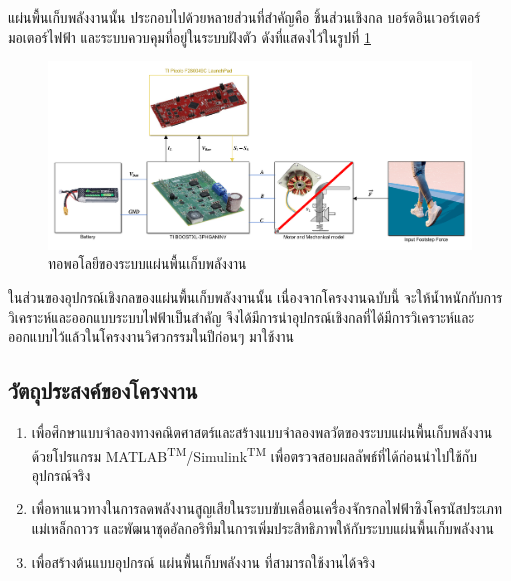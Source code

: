 \documentclass[11pt,a4paper]{article}
\begin{document}
แผ่นพื้นเก็บพลังงานนั้น ประกอบไปด้วยหลายส่วนที่สำคัญคือ ชิ้นส่วนเชิงกล บอร์ดอินเวอร์เตอร์ มอเตอร์ไฟฟ้า และระบบควบคุมที่อยู่ในระบบฝังตัว ดังที่แสดงไว้ในรูปที่ \ref{genpathtopology}

\begin{figure}[!h]
    \centering
    \includegraphics[width=\textwidth]{genpath_topology.png}
    \caption{ทอพอโลยีของระบบแผ่นพื้นเก็บพลังงาน}
    \label{genpathtopology}
\end{figure}

ในส่วนของอุปกรณ์เชิงกลของแผ่นพื้นเก็บพลังงานนั้น เนื่องจากโครงงานฉบับนี้ จะให้น้ำหนักกับการวิเคราะห์และออกแบบระบบไฟฟ้าเป็นสำคัญ จึงได้มีการนำอุปกรณ์เชิงกลที่ได้มีการวิเคราะห์และออกแบบไว้แล้วในโครงงานวิศวกรรมในปีก่อนๆ \cite{GpH:01} มาใช้งาน

\subsection{วัตถุประสงค์ของโครงงาน}
\begin{enumerate}
    \item เพื่อศึกษาแบบจำลองทางคณิตศาสตร์และสร้างแบบจำลองพลวัตของระบบแผ่นพื้นเก็บพลังงานด้วยโปรแกรม MATLAB\textsuperscript{TM}/Simulink\textsuperscript{TM} เพื่อตรวจสอบผลลัพธ์ที่ได้ก่อนนำไปใช้กับอุปกรณ์จริง
    \item เพื่อหาแนวทางในการลดพลังงานสูญเสียในระบบขับเคลื่อนเครื่องจักรกลไฟฟ้าซิงโครนัสประเภทแม่เหล็กถาวร และพัฒนาชุดอัลกอริทึมในการเพิ่มประสิทธิภาพให้กับระบบแผ่นพื้นเก็บพลังงาน
    \item เพื่อสร้างต้นแบบอุปกรณ์ แผ่นพื้นเก็บพลังงาน ที่สามารถใช้งานได้จริง

\end{enumerate}
\end{document}
